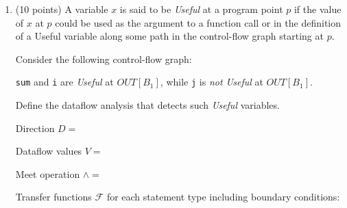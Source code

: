 \documentclass[12pt]{article}
\begin{document}
\begin{enumerate}
      
      \clearpage
      \item (10 points) A variable $x$ is said to be \emph{Useful} at a program point $p$ 
      if the value of $x$ at $p$ could be used as the argument to a function call or
      in the definition of a Useful variable along some path in the control-flow graph starting
      at $p$.

      Consider the following control-flow graph:


        \lstinline$sum$ and \lstinline$i$ are \emph{Useful} at $OUT[B_1]$,
      while \lstinline$j$ is \emph{not Useful} at $OUT[B_1]$.


      Define the dataflow analysis that detects such \emph{Useful} variables.

      \begin{mdframed}
        Direction $D =$  %

        Dataflow values $V = $  %

        Meet operation $\wedge = $ %

        Transfer functions $\mathcal{F}$ for each statement type including boundary conditions:  %


\end{mdframed}
\end{enumerate}
\end{document}
